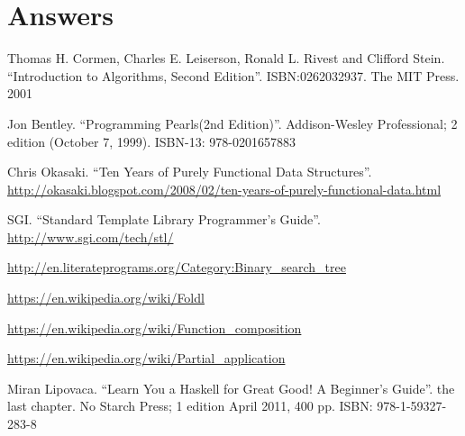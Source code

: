 \documentclass[b5paper]{article}
\begin{document}
\ifx\wholebook\relax \else
\section{Answers}
\shipoutAnswer

\begin{thebibliography}{99}

Thomas H. Cormen, Charles E. Leiserson, Ronald L. Rivest and Clifford Stein.
``Introduction to Algorithms, Second Edition''. ISBN:0262032937. The MIT Press. 2001

Jon Bentley. ``Programming Pearls(2nd Edition)''. Addison-Wesley Professional; 2 edition (October 7, 1999). ISBN-13: 978-0201657883

Chris Okasaki. ``Ten Years of Purely Functional Data Structures''. \url{http://okasaki.blogspot.com/2008/02/ten-years-of-purely-functional-data.html}

SGI. ``Standard Template Library Programmer's Guide''. \url{http://www.sgi.com/tech/stl/}

\url{http://en.literateprograms.org/Category:Binary_search_tree}

\url{https://en.wikipedia.org/wiki/Foldl}

\url{https://en.wikipedia.org/wiki/Function_composition}

\url{https://en.wikipedia.org/wiki/Partial_application}

Miran Lipovaca. ``Learn You a Haskell for Great Good! A Beginner's Guide''. the last chapter. No Starch Press; 1 edition April 2011, 400 pp. ISBN: 978-1-59327-283-8

\end{thebibliography}

\expandafter\enddocument
\fi
\end{document}
